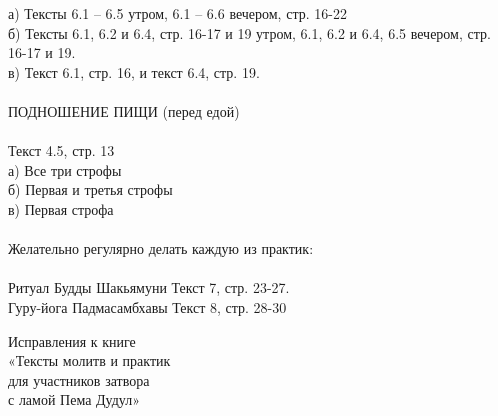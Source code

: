 \documentclass[4pt,oneside]{article}
\begin{document}
\indent а) Тексты 6.1 – 6.5 утром, 6.1 – 6.6 вечером, стр. 16-22\\
\indent б) Тексты 6.1, 6.2 и 6.4, стр. 16-17 и 19 утром, 6.1, 6.2 и 6.4, 6.5 вечером, стр. 16-17 и 19.\\
\indent в) Текст 6.1, стр. 16, и текст 6.4, стр. 19.\\
\\
ПОДНОШЕНИЕ ПИЩИ (перед едой)\\
\\
\indent Текст 4.5, стр. 13\\
\indent а) Все три строфы\\
\indent б) Первая и третья строфы \\
\indent в) Первая строфа\\
\\
Желательно регулярно делать каждую из практик:\\
\\
Ритуал Будды Шакьямуни Текст 7, стр. 23-27.\\
Гуру-йога Падмасамбхавы Текст 8, стр. 28-30

\newpage
   \thispagestyle{empty}

{\centering
\Large
Исправления к книге\\
«Тексты молитв и практик\\
для участников затвора\\
с ламой Пема Дудул»\\
}
\vspace{2cm}
\\
\noindent
\end{document}
